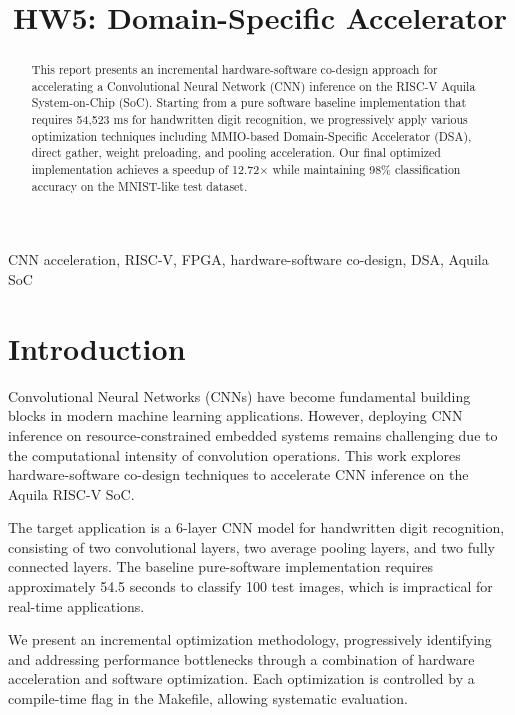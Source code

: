 \documentclass[conference]{IEEEtran}
\begin{document}
\title{HW5: Domain-Specific
Accelerator}

\author{}

\maketitle

\begin{abstract}
This report presents an incremental hardware-software co-design approach for accelerating a Convolutional Neural Network (CNN) inference on the RISC-V Aquila System-on-Chip (SoC). Starting from a pure software baseline implementation that requires 54,523 ms for handwritten digit recognition, we progressively apply various optimization techniques including MMIO-based Domain-Specific Accelerator (DSA), direct gather, weight preloading, and pooling acceleration. Our final optimized implementation achieves a speedup of 12.72$\times$ while maintaining 98\% classification accuracy on the MNIST-like test dataset.
\end{abstract}

\begin{IEEEkeywords}
CNN acceleration, RISC-V, FPGA, hardware-software co-design, DSA, Aquila SoC
\end{IEEEkeywords}

\section{Introduction}

Convolutional Neural Networks (CNNs) have become fundamental building blocks in modern machine learning applications. However, deploying CNN inference on resource-constrained embedded systems remains challenging due to the computational intensity of convolution operations. This work explores hardware-software co-design techniques to accelerate CNN inference on the Aquila RISC-V SoC.

The target application is a 6-layer CNN model for handwritten digit recognition, consisting of two convolutional layers, two average pooling layers, and two fully connected layers. The baseline pure-software implementation requires approximately 54.5 seconds to classify 100 test images, which is impractical for real-time applications.

We present an incremental optimization methodology, progressively identifying and addressing performance bottlenecks through a combination of hardware acceleration and software optimization. Each optimization is controlled by a compile-time flag in the Makefile, allowing systematic evaluation.
\end{document}
